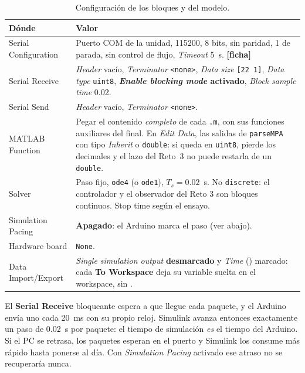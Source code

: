\documentclass[11pt,letterpaper]{article}
\newcommand{\blq}[1]{\textsf{\textbf{#1}}}                 %
\newcommand{\sen}[1]{\texttt{\detokenize{#1}}}             %
\newcommand{\ficha}{\textcolor{verdeOK}{\textbf{[ficha]}}}  %
\begin{document}
\begin{table}[H]\centering\small
\caption{Configuración de los bloques y del modelo.}\label{tab:config}
\begin{tabularx}{\linewidth}{@{}l >{\raggedright\arraybackslash}X@{}}\toprule
\textbf{Dónde} & \textbf{Valor}\\\midrule
Serial Configuration & Puerto COM de la unidad, 115200, 8 bits, sin paridad, 1 de parada, sin control de flujo, \emph{Timeout} 5~s. \ficha\\
Serial Receive & \emph{Header} vacío, \emph{Terminator} \texttt{<none>}, \emph{Data size} \texttt{[22 1]}, \emph{Data type} \texttt{uint8}, \textbf{\emph{Enable blocking mode} activado}, \emph{Block sample time} 0.02.\\
Serial Send & \emph{Header} vacío, \emph{Terminator} \texttt{<none>}.\\
MATLAB Function & Pegar el contenido \emph{completo} de cada \texttt{.m}, con sus funciones auxiliares del final. En \emph{Edit Data}, las salidas de \texttt{parseMPA} con tipo \emph{Inherit} o \texttt{double}: si \sen{u_ap} queda en \texttt{uint8}, pierde los decimales y el lazo del Reto~3 no puede restarla de un \texttt{double}.\\
Solver & Paso fijo, \texttt{ode4} (o \texttt{ode1}), $T_s=0.02$~s. No \texttt{discrete}: el controlador y el observador del Reto 3 son bloques continuos. Stop time según el ensayo.\\
Simulation Pacing & \textbf{Apagado}: el Arduino marca el paso (ver abajo).\\
Hardware board & \texttt{None}.\\
Data Import/Export & \emph{Single simulation output} \textbf{desmarcado} y \emph{Time} (\sen{tout}) marcado: cada \blq{To Workspace} deja su variable suelta en el workspace, sin \sen{out}.\\\bottomrule
\end{tabularx}
\end{table}

\begin{nota}
El \blq{Serial Receive} bloqueante espera a que llegue cada paquete, y el Arduino envía uno cada \SI{20}{ms} con su propio reloj. Simulink avanza entonces exactamente un paso de \SI{0.02}{s} por paquete: el tiempo de simulación \emph{es} el tiempo del Arduino. Si el PC se retrasa, los paquetes esperan en el puerto y Simulink los consume más rápido hasta ponerse al día. Con \emph{Simulation Pacing} activado ese atraso no se recuperaría nunca.
\end{nota}
\end{document}
